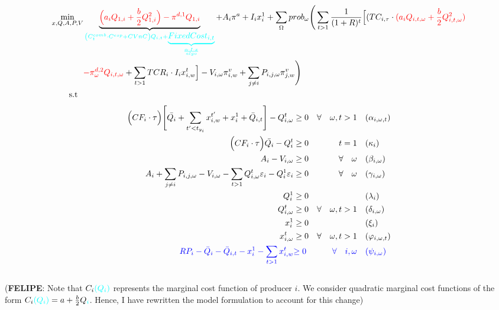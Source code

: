 \documentclass[11pt, letterpaper]{article}
\newcommand{\seba}{\textcolor[rgb]{0,1,1}}
\begin{document}
\begin{align}
\min_{x,Q,A,P,V} & \underbrace{{\color{red}\Big(a_iQ_{1,i}+\frac{b}{2}Q_{1,i}^{2}\Big)-\pi^{d,1} Q_{1,i}}}_{\seba{\left(C_t^{comb}\cdot C^{esp}+CVnC\right)Q_{i,t}+\underbrace{FixedCost_{i,t}}_{\frac{\alpha\cdot I\cdot x}{algo}}}} + A_i \pi^{a} + I_i x_i^{1} + \sum_{\Omega} prob_\omega   \Bigg( \sum_{t>1} \frac{1}{(1+R)^t} \Big[ (TC_{i,\tau}\cdot {\color{red}(a_i Q_{i,t,\omega}+\frac{b}{2}Q_{i,t,\omega}^{2})}\nonumber \\
    & {\color{red}-\pi^{d,2}_{\omega} Q_{i,t,\omega}} + \sum_{t > 1} TCR_i \cdot I_ix^{t}_{i,w} \Big] - V_{i,\omega}\pi_{i,w}^v+\sum_{j\neq i}  P_{i,j,\omega}\pi_{j,w}^v\Bigg)  \label{prodFO} \\
     \textrm{s.t \ } \nonumber
\end{align}
\begin{align}
    \Big(CF_i \cdot\tau\Big)  \Bigg[\bar{Q_i} + \sum_{t^{\prime}<t_{y_i}} x^{t^{\prime}}_{i,w} + x_i^{1}+ \bar{Q}_{i,t} \Bigg] - Q_{i,\omega}^{t} & \geq 0  & \forall  \quad \omega, t  > 1 & \quad (\alpha_{i,\omega,t}) \label{const.1}\\
    \Big(CF_i\cdot\tau \Big)\bar{Q_i}-Q_{i}^{t} & \geq 0  &  \quad t  =1 & \quad (\kappa_i) \label{const.2} \\
 A_{i} -V_{i,\omega} & \geq  0  & \forall  \quad \omega & \quad (\beta_{i,\omega})\\
 A_{i} + \sum_{j \neq i}P_{i,j,\omega} - V_{i,\omega}-\sum_{t>1}Q_{i, \omega}^{t}\varepsilon_{i}-Q_i^{1}\varepsilon_{i} & \geq  0  &\forall \quad \omega & \quad (\gamma_{i,\omega})\\
 Q_i^{1} & \geq  0 & \quad & \quad (\lambda_i)\\
 Q_{i, \omega}^{t} & \geq  0   & \forall  \quad \omega, t >1 & \quad (\delta_{i,\omega})\\
  x_i^{1} & \geq  0 & \quad & \quad (\xi_i)\\
  x_{i, \omega}^{t} & \geq  0   & \forall  \quad \omega, t >1 & \quad (\varphi_{i,\omega,t})\\
{\color{blue} RP_i - \bar{Q}_i - \bar{Q}_{i,t} - x^{1}_i - \sum_{t > 1} x^{t}_{i,w} } & {\color{blue} \geq 0} & {\color{blue} \forall \quad i,\omega }&  {\color{blue} \quad (\psi_{i,\omega}) }
  \end{align}\\
  
  
 
 (\textbf{FELIPE}: Note that $C_i\seba{(Q_i)}$ represents the \seba{marginal} cost function of producer $i$. We consider quadratic \seba{marginal} cost functions of the form $C_i\seba{(Q_i)}=a+\frac{b}{2}Q\seba{_i}$. Hence, I have rewritten the model formulation to account for this change)
\end{document}
